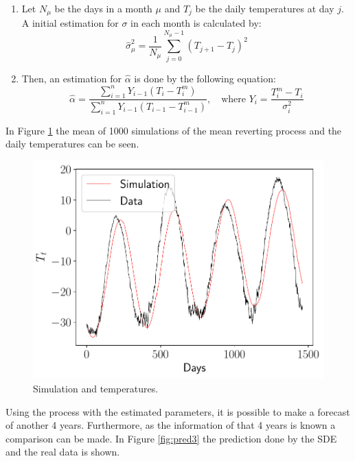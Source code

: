 \documentclass[11pt]{article}
\theoremstyle{definition}
\theoremstyle{remark}
\theoremstyle{remark}
\begin{document}
\begin{enumerate}
\item Let $N_\mu$ be the days in a month $\mu$ and $T_j$ be the daily
  temperatures at day $j$. A initial estimation for $\sigma$ in each month is
  calculated by:
  \begin{equation*}
    \hat{\sigma}_\mu^2 = \frac{1}{N_\mu}\sum_{j=0}^{N_\mu - 1} (T_{j+1} - T_j)^2
  \end{equation*}

\item Then, an estimation for $\hat{\alpha}$ is done by the following
  equation:
  \begin{equation*}
    \hat{\alpha} = \dfrac{\displaystyle\sum_{i=1}^nY_{i-1}(T_i - T_i^m)}{
      \displaystyle\sum_{i=1}^nY_{i-1} (T_{i-1} - T_{i-1}^m)}, \quad
    \text{where } Y_i = \frac{T_{i}^m - T_{i}}{\sigma_i^2}
  \end{equation*}
\end{enumerate}

In Figure \ref{fig:estimated3} the mean of 1000 simulations of the
mean reverting process and the daily temperatures can be seen.

\begin{figure}
  \centering
  \includegraphics[scale=.5]{estimated_temps.pdf}
  \caption{Simulation and temperatures.}
  \label{fig:estimated3}
\end{figure}

Using the process with the estimated parameters, it is possible to
make a forecast of another 4 years. Furthermore, as the information of
that 4 years is known a comparison can be made. In Figure
\ref{fig:pred3} the prediction done by the SDE and the real data is
shown.
\end{document}
